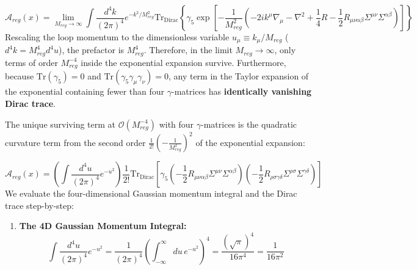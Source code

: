 \documentclass[aps,prd,onecolumn,superscriptaddress,nofootinbib,longbibliography,10pt]{revtex4-2}
\begin{document}
{{  \[ \mathcal{A}_{reg}(x) = \lim_{M_{reg}\to\infty}\int\frac{d^4k}{(2\pi)^4}e^{-k^2/M_{reg}^2}\text{Tr}_{\text{Dirac}}\left\{ \gamma_5\exp\left[ -\frac{1}{M_{reg}^2}\left(-2ik^\mu\nabla_\mu - \nabla^2 + \frac{1}{4}R - \frac{1}{2}R_{\mu\nu\alpha\beta}\Sigma^{\mu\nu}\Sigma^{\alpha\beta}\right) \right] \right\} \]
  Rescaling the loop momentum to the dimensionless variable \(u_\mu \equiv k_\mu/M_{reg}\) (\(d^4k = M_{reg}^4 d^4u\)), the prefactor is \(M_{reg}^4\). Therefore, in the limit \(M_{reg} \to \infty\), only terms of order \(M_{reg}^{-4}\) inside the exponential expansion survive. Furthermore, because \(\text{Tr}(\gamma_5) = 0\) and \(\text{Tr}(\gamma_5\gamma_\mu\gamma_\nu) = 0\), any term in the Taylor expansion of the exponential containing fewer than four \(\gamma\)-matrices has \textbf{identically vanishing Dirac trace}.


  The unique surviving term at \(\mathcal{O}(M_{reg}^{-4})\) with four \(\gamma\)-matrices is the quadratic curvature term from the second order \(\frac{1}{2!}\left(-\frac{1}{M_{reg}^2}\right)^2\) of the exponential expansion:


  \[ \mathcal{A}_{reg}(x) = \left(\int\frac{d^4u}{(2\pi)^4}e^{-u^2}\right)\frac{1}{2!}\text{Tr}_{\text{Dirac}}\left[ \gamma_5\left(-\frac{1}{2}R_{\mu\nu\alpha\beta}\Sigma^{\mu\nu}\Sigma^{\alpha\beta}\right)\left(-\frac{1}{2}R_{\rho\sigma\gamma\delta}\Sigma^{\rho\sigma}\Sigma^{\gamma\delta}\right) \right] \]
  We evaluate the four-dimensional Gaussian momentum integral and the Dirac trace step-by-step:


  
\begin{enumerate}
    
\item \textbf{The 4D Gaussian Momentum Integral:}
    \[ \int\frac{d^4u}{(2\pi)^4}e^{-u^2} = \frac{1}{(2\pi)^4}\left(\int_{-\infty}^\infty du\,e^{-u^2}\right)^4 = \frac{(\sqrt{\pi})^4}{16\pi^4} = \frac{1}{16\pi^2} \]
    

\end{enumerate}}}
\end{document}
